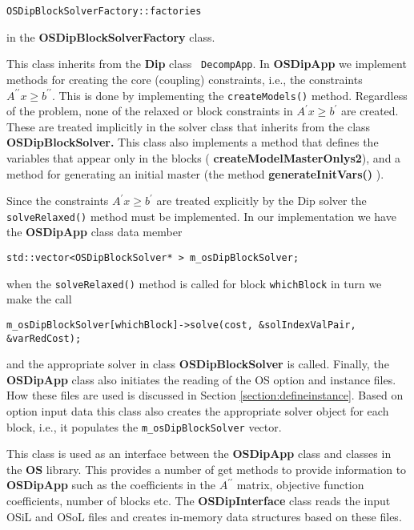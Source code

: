 \begin{verbatim}
OSDipBlockSolverFactory::factories
\end{verbatim}
in the {\bf OSDipBlockSolverFactory} class. 

\vskip 8pt
  This class inherits from the {\bf Dip} class {\tt
DecompApp}. In {\bf OSDipApp} we implement methods for creating the core
(coupling) constraints, i.e., the constraints $A^{\prime \prime} x \ge
b^{\prime \prime}$.  This is done by implementing the  {\tt createModels()}
method. Regardless of the problem, none of the relaxed or block constraints in $A^{\prime } x \ge
b^{\prime}$ are created. These are treated implicitly in the solver class that
inherits from the class {\bf OSDipBlockSolver.}  This class also implements a
method that defines the variables that appear only in the blocks ({\bf
createModelMasterOnlys2}), and a method for generating an initial master (the
method {\bf generateInitVars()  }). 

Since the constraints $A^{\prime } x \ge
b^{\prime}$ are treated explicitly by the Dip solver the {\tt solveRelaxed()}
method must be implemented. In our implementation we have the {\bf OSDipApp} class data
member
\begin{verbatim}
std::vector<OSDipBlockSolver* > m_osDipBlockSolver;
\end{verbatim}
when the {\tt solveRelaxed()} method is called for block {\tt whichBlock} in
turn we make the call
\begin{verbatim}
m_osDipBlockSolver[whichBlock]->solve(cost, &solIndexValPair, &varRedCost);
\end{verbatim}
and the appropriate solver in class {\bf OSDipBlockSolver} is called. Finally,
the {\bf OSDipApp} class also  initiates the reading of the OS option and
instance files. How these files are used is discussed in Section \ref{section:defineinstance}. 
Based on option input
data this class also creates the appropriate solver object for each block, i.e.,
it populates the {\tt  m\_osDipBlockSolver} vector.

\vskip 8pt
 This class is used  as an interface between the
{\bf OSDipApp} class and classes in the {\bf OS} library. This provides a number
of get methods to provide information to {\bf OSDipApp} such as the coefficients
in the $A^{\prime \prime}$ matrix, objective function coefficients, number of
blocks etc. The {\bf OSDipInterface} class reads the input OSiL and OSoL files
and creates in-memory data structures based on these files. 


